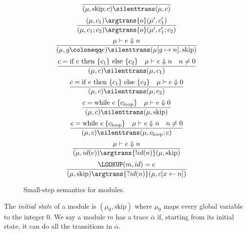 \begin{figure}[h]
	\begin{equation}
	\frac{}{(\mu, \textrm{skip}; c) \silenttrans (\mu, c)}
	\end{equation}
	\begin{equation}
	\frac{(\mu, c_1) \argtrans{o} (\mu', c_1')}{(\mu, c_1; c_2) \argtrans{o} (\mu', c_1'; c_2)}
	\end{equation}
	\begin{equation}
	\frac{\mu \vdash e \Downarrow n}{(\mu, g \coloneqq e) \silenttrans (\mu[g \mapsto n], \textrm{skip})}
	\end{equation}
	\begin{equation}
	\frac{c = \textrm{if } e \textrm{ then } \{c_1\} \textrm{ else } \{c_2\} \quad \mu \vdash e \Downarrow n \quad n \neq 0}{(\mu, c) \silenttrans (\mu, c_1)}
	\end{equation}
	\begin{equation}
	\frac{c = \textrm{if } e \textrm{ then } \{c_1\} \textrm{ else } \{c_2\} \quad \mu \vdash e \Downarrow 0}{(\mu, c) \silenttrans (\mu, c_2)}
	\end{equation}
	\begin{equation}
	\frac{c = \textrm{while } e \: \{ c_{\textrm{loop}} \} \quad \mu \vdash e \Downarrow 0}{(\mu, c) \silenttrans (\mu, \textrm{skip})}
	\end{equation}
	\begin{equation}
	\frac{c = \textrm{while } e \: \{ c_{\textrm{loop}} \} \quad \mu \vdash e \Downarrow n \quad n \neq 0}{(\mu, c) \silenttrans (\mu, c_{\textrm{loop}}; c)}
	\end{equation}
	\begin{equation}
	\frac{\mu \vdash e \Downarrow n}{(\mu, id(e)) \argtrans{!id(n)} (\mu, \mathrm{skip})}
	\end{equation}
	\begin{equation}
	\frac
		{\LOOKUP(m,id) = c}
		{(\mu, \textrm{skip}) \argtrans{?id(n)} (\mu, c[x \leftarrow n])}
	\end{equation}
	\caption{Small-step semantics for modules.}
	\label{fig:semhandler}
\end{figure}


The {\em initial state} of a module is $(\mu_0, \textrm{skip})$ where $\mu_0$ maps every global variable to the integer $0$.
%
We say a module $m$ has a trace $\overline{\alpha}$ if, starting from its initial state, it can do all the transitions in $\overline{\alpha}$.

